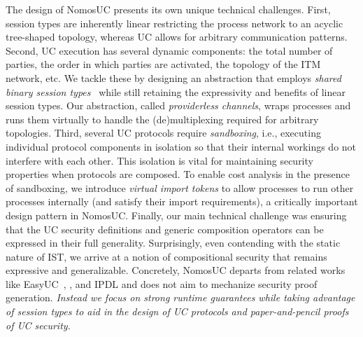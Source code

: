 
The design of NomosUC presents its own unique technical challenges.
First, session types are inherently linear restricting the process network to an acyclic tree-shaped topology,
whereas UC allows for arbitrary communication patterns.
Second, UC execution has several dynamic components: the total number of parties, the order in which parties are activated,
the topology of the ITM network, etc.
We tackle these by designing an abstraction that employs \emph{shared binary session types}~\cite{balzer2017manifest}
while still retaining the expressivity and benefits of linear session types.
Our abstraction, called \emph{providerless channels}, wraps processes and runs them virtually to handle
the (de)multiplexing required for arbitrary topologies.
Third, several UC protocols require \emph{sandboxing}, i.e., executing individual protocol components in isolation so that their
internal workings do not interfere with each other.
This isolation is vital for maintaining security properties when protocols are composed.
To enable cost analysis in the presence of sandboxing, we introduce \emph{virtual import tokens} to allow processes to
run other processes internally (and satisfy their import requirements), a critically important design pattern in NomosUC.
Finally, our main technical challenge was ensuring that the UC security definitions and generic composition operators
can be expressed in their full generality.
Surprisingly, even contending with the static nature of IST, we arrive at a notion of compositional security
that remains expressive and generalizable.
Concretely, NomosUC departs from related works like EasyUC~\cite{easyuc}, \citet{barbosa}, and IPDL\cite{ipdl} and does
not aim to mechanize security proof generation.
\emph{Instead we focus on strong runtime guarantees while taking advantage of session types to aid in the design of UC protocols and paper-and-pencil proofs of UC security.}

